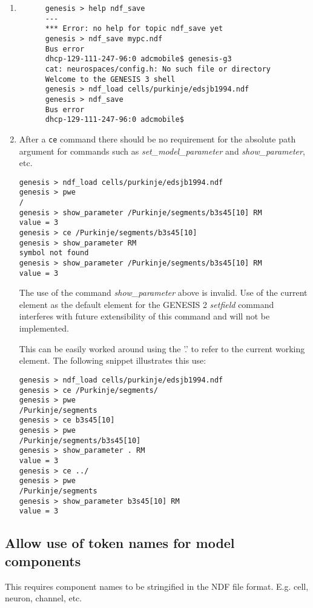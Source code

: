 \documentclass[12pt]{article}
\begin{document}
\begin{enumerate}
   \item 
   \begin{verbatim}
      genesis > help ndf_save
      ---
      *** Error: no help for topic ndf_save yet
      genesis > ndf_save mypc.ndf
      Bus error
      dhcp-129-111-247-96:0 adcmobile$ genesis-g3
      cat: neurospaces/config.h: No such file or directory
      Welcome to the GENESIS 3 shell
      genesis > ndf_load cells/purkinje/edsjb1994.ndf
      genesis > ndf_save
      Bus error
      dhcp-129-111-247-96:0 adcmobile$
   \end{verbatim}
   
   \item After a {\tt ce} command there should be no requirement for the absolute path argument for commands such as {\it set\_model\_parameter} and {\it show\_parameter}, etc.
\begin{verbatim}
genesis > ndf_load cells/purkinje/edsjb1994.ndf
genesis > pwe
/
genesis > show_parameter /Purkinje/segments/b3s45[10] RM
value = 3
genesis > ce /Purkinje/segments/b3s45[10]  
genesis > show_parameter RM
symbol not found      
genesis > show_parameter /Purkinje/segments/b3s45[10] RM
value = 3
\end{verbatim} 

     The use of the command {\it show\_parameter} above is invalid.
     Use of the current element as the default element for the GENESIS
     2 {\it setfield} command interferes with future extensibility of
     this command and will not be implemented.

     This can be easily worked around using the '.' to refer to the
     current working element.  The following snippet illustrates this
     use:
\begin{verbatim}
genesis > ndf_load cells/purkinje/edsjb1994.ndf
genesis > ce /Purkinje/segments/
genesis > pwe
/Purkinje/segments
genesis > ce b3s45[10]
genesis > pwe
/Purkinje/segments/b3s45[10]
genesis > show_parameter . RM
value = 3
genesis > ce ../
genesis > pwe
/Purkinje/segments
genesis > show_parameter b3s45[10] RM
value = 3
\end{verbatim}
\end{enumerate}

\subsection{Allow use of token names for model components}

This requires component names to be stringified in the NDF file
format. E.g. cell, neuron, channel, etc.
\end{document}
